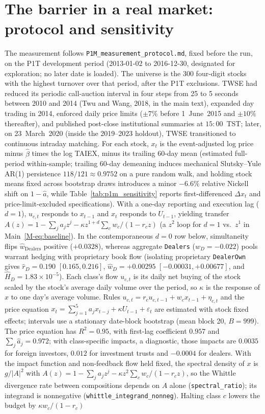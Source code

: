 \documentclass[12pt]{article}
\theoremstyle{definition}
\theoremstyle{remark}
\begin{document}
\section{The barrier in a real market: protocol and sensitivity}\label{app:barrier}

The measurement follows \nolinkurl{P1M_measurement_protocol.md}, fixed before the run, on the P1T development period (2013-01-02 to 2016-12-30, designated for exploration; no later date is loaded). The universe is the 300 four-digit stocks with the highest turnover over that period, after the P1T exclusions. TWSE had reduced its periodic call-auction interval in four steps from 25 to 5 seconds between 2010 and 2014 (Twu and Wang, 2018, in the main text), expanded day trading in 2014, enforced daily price limits ($\pm 7\%$ before 1~June~2015 and $\pm 10\%$ thereafter), and published post-close institutional summaries at $15{:}00$~TST; later, on 23~March~2020 (inside the 2019--2023 holdout), TWSE transitioned to continuous intraday matching. For each stock, $x_t$ is the event-adjusted log price minus $\hat\beta$ times the log TAIEX, minus its trailing 60-day mean (estimated full-period within-sample; trailing 60-day demeaning induces mechanical Slutsky--Yule AR(1) persistence $118/121 \approx 0.9752$ on a pure random walk, and holding stock means fixed across bootstrap draws introduces a minor $-6.6\%$ relative Nickell shift on $1-\hat a$, while Table~\ref{tab:p1m_sensitivity} reports first-differenced $\Delta x_t$ and price-limit-excluded specifications). With a one-day reporting and execution lag ($d=1$), $u_{c,t}$ responds to $x_{t-1}$ and $x_t$ responds to $U_{t-1}$, yielding transfer $A(z) = 1 - \sum_j a_j z^j - \kappa z^{1+d} \sum_c w_c/(1 - r_c z)$ (a $z^2$ loop for $d=1$ vs.\ $z^1$ in Main~\eqref{M-eq:baseline}). In the contemporaneous $d=0$ row below, simultaneity flips $\hat w_{\mathrm{Dealers}}$ positive ($+0.0328$), whereas aggregate \texttt{Dealers} ($w_D = -0.022$) pools warrant hedging with proprietary book flow (isolating proprietary \texttt{DealerOwn} gives $\hat r_D = 0.190$ $[0.165, 0.216]$, $\hat w_D = +0.00295$ $[-0.00031, +0.00677]$, and $\hat H_D = 1.83\times 10^{-5}$). Each class's flow $u_{c,t}$ is its daily net buying of the stock scaled by the stock's average daily volume over the period, so $\kappa$ is the response of $x$ to one day's average volume. Rules $u_{c,t}=r_cu_{c,t-1}+w_cx_{t-1}+\eta_{c,t}$ and the price equation $x_t=\sum_{j=1}^5a_jx_{t-j}+\kappa U_{t-1}+\varepsilon_t$ are estimated with stock fixed effects; intervals use a stationary date-block bootstrap (mean block 20, $B=999$). The price equation has $R^2=0.95$, with first-lag coefficient $0.957$ and $\sum_j\hat a_j=0.972$; with class-specific impacts, a diagnostic, those impacts are $0.0035$ for foreign investors, $0.012$ for investment trusts and $-0.0004$ for dealers. With the impact function and non-feedback flow held fixed, the spectral density of $x$ is $g/|A|^2$ with $A(z)=1-\sum_ja_jz^j-\kappa z^{2}\sum_cw_c/(1-r_cz)$, so the Whittle divergence rate between compositions depends on $A$ alone (\nolinkurl{spectral_ratio}); its integrand is nonnegative (\nolinkurl{whittle_integrand_nonneg}). Halting class $c$ lowers the budget by $\kappa w_c/(1-r_c)$ 
\end{document}
